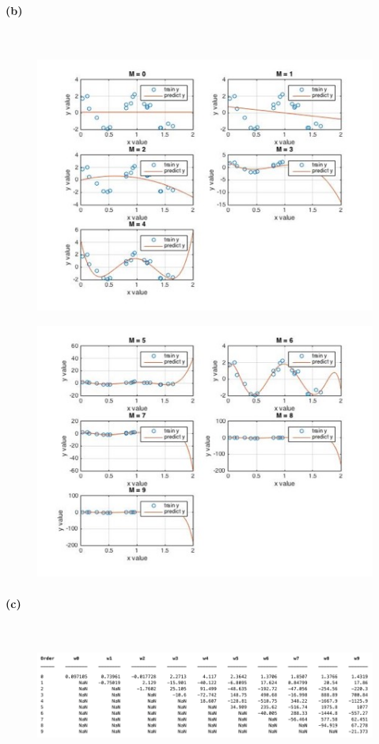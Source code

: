 \documentclass[]{article}
\begin{document}
	\paragraph{(b)}\mbox{}\\
	
	\begin{figure}[H]
		\centering
		\includegraphics[width=0.8\linewidth]{2b1}
		\caption{}
		\label{fig:2b1}
	\end{figure}
	\begin{figure}[H]
		\centering
		\includegraphics[width=0.8\linewidth]{2b2}
		\caption{}
		\label{fig:2b2}
	\end{figure}
	
	\paragraph{(c)}\mbox{}\\
	
	\begin{figure}[H]
		\centering
		\includegraphics[width=1.2\linewidth]{2c1}
		\caption{}
		\label{fig:2c1}
	\end{figure}
	
\end{document}
